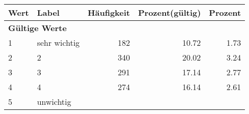      \begin{longtable}{lXrrr}
     \toprule
     \textbf{Wert} & \textbf{Label} & \textbf{Häufigkeit} & \textbf{Prozent(gültig)} & \textbf{Prozent} \\
     \endhead
     \midrule
     \multicolumn{5}{l}{\textbf{Gültige Werte}}\\

     1 &
     \multicolumn{1}{X}{ sehr wichtig   } &


       \num{182} &
       \num[round-mode=places,round-precision=2]{10,72} &
         \num[round-mode=places,round-precision=2]{1,73} \\

     2 &
     \multicolumn{1}{X}{ 2   } &


       \num{340} &
       \num[round-mode=places,round-precision=2]{20,02} &
         \num[round-mode=places,round-precision=2]{3,24} \\

     3 &
     \multicolumn{1}{X}{ 3   } &


       \num{291} &
       \num[round-mode=places,round-precision=2]{17,14} &
         \num[round-mode=places,round-precision=2]{2,77} \\

     4 &
     \multicolumn{1}{X}{ 4   } &


       \num{274} &
       \num[round-mode=places,round-precision=2]{16,14} &
         \num[round-mode=places,round-precision=2]{2,61} \\

     5 &
     \multicolumn{1}{X}{ unwichtig   } &



\end{longtable}
